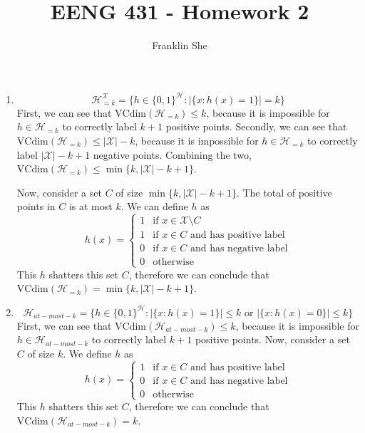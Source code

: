 \documentclass[10pt]{article}
\newenvironment{problem}[2][Problem]{\begin{trivlist}
\item[\hskip \labelsep {\bfseries #1}\hskip \labelsep {\bfseries #2.}]}{\end{trivlist}}
\begin{document}
\title{\vspace{-2cm} EENG 431 - Homework 2}
\author{Franklin She}

\maketitle

\begin{problem}{2}
    \hfill
    \begin{enumerate}
        \item
            $$\mathcal{H}_{=k}^\mathcal{X} = \{h \in \{0, 1\}^\mathcal{H}: |\{x : h(x) = 1\}| = k\}$$
            First, we can see that $\text{VCdim}(\mathcal{H}_{=k}) \leq k$, because it is impossible for $h \in \mathcal{H}_{=k}$ to correctly label $k+1$ positive points. Secondly, we can see that $\text{VCdim}(\mathcal{H}_{=k}) \leq |\mathcal{X}| - k$, because it is impossible for $h \in \mathcal{H}_{=k}$ to correctly label $|\mathcal{X}| - k + 1$ negative points. Combining the two, $\text{VCdim}(\mathcal{H}_{=k}) \leq \min{\{k, |\mathcal{X}| - k + 1\}}$.
            
            Now, consider a set $C$ of size $\min{\{k, |\mathcal{X}| - k + 1\}}$. The total of positive points in $C$ is at most $k$. We can define $h$ as
            $$h(x) = \begin{cases}
                1 & \text{if } x \in \mathcal{X} \setminus C \\
                1 & \text{if } x \in C \text{ and has positive label} \\
                0 & \text{if } x \in C \text{ and has negative label} \\
                0 & \text{otherwise}
            \end{cases}$$
            This $h$ shatters this set $C$, therefore we can conclude that $\text{VCdim}(\mathcal{H}_{=k}) = \min{\{k, |\mathcal{X}| - k + 1\}}$.
        \item
            $$\mathcal{H}_{at-most-k} = \{h \in \{0, 1\}^\mathcal{H}: |\{x : h(x) = 1\}| \leq k
                \text{ or } |\{x : h(x) = 0\}| \leq k\}$$
            First, we can see that $\text{VCdim}(\mathcal{H}_{at-most-k}) \leq k$, because it is impossible for $h \in \mathcal{H}_{at-most-k}$ to correctly label $k+1$ positive points. 
            Now, consider a set $C$ of size $k$. We define $h$ as
            $$h(x) = \begin{cases}
                1 & \text{if } x \in C \text{ and has positive label} \\
                0 & \text{if } x \in C \text{ and has negative label} \\
                0 & \text{otherwise}
            \end{cases}$$
            This $h$ shatters this set $C$, therefore we can conclude that $\text{VCdim}(\mathcal{H}_{at-most-k}) = k$.
    \end{enumerate}
\end{problem}
\end{document}
